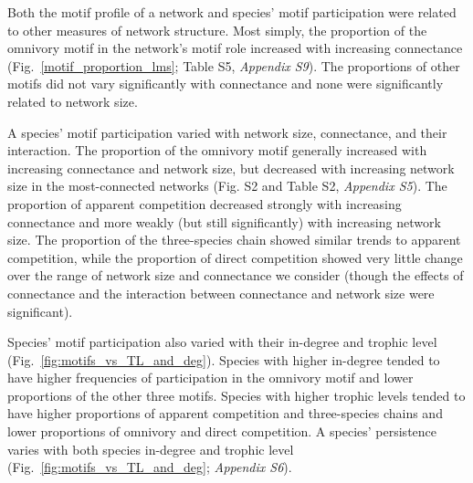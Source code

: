 \documentclass[12pt]{article}
\begin{document}
\begin{spacing}{2.0}
        Both the motif profile of a network and species' motif participation were related to other measures of network structure.
        Most simply, the proportion of the omnivory motif in the network's motif role increased with increasing connectance (Fig.~\ref{motif_proportion_lms}; Table S5, \emph{Appendix S9}).
        The proportions of other motifs did not vary significantly with connectance and none were significantly related to network size.


        A species' motif participation varied with network size, connectance, and their interaction. 
        The proportion of the omnivory motif generally increased with increasing connectance and network size, but decreased with increasing network size in the most-connected networks (Fig. S2 and Table S2, \emph{Appendix S5}).
        The proportion of apparent competition decreased strongly with increasing connectance and more weakly (but still significantly) with increasing network size.
        The proportion of the three-species chain showed similar trends to apparent competition, while the proportion of direct competition showed very little change over the range of network size and connectance we consider (though the effects of connectance and the interaction between connectance and network size were significant).

        
        Species' motif participation also varied with their in-degree and trophic level (Fig.~\ref{fig:motifs_vs_TL_and_deg}).
        Species with higher in-degree tended to have higher frequencies of participation in the omnivory motif and lower proportions of the other three motifs.
        Species with higher trophic levels tended to have higher proportions of apparent competition and three-species chains and lower proportions of omnivory and direct competition. 
        A species' persistence varies with both species in-degree and trophic level (Fig.~\ref{fig:motifs_vs_TL_and_deg}; \emph{Appendix S6}). 
        
        
    

\end{spacing}
\end{document}
